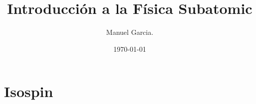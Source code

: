\documentclass{article}
\title{Introducción a la Física Subatomic }
\author{Manuel Garcia.}
\date{\today}
\begin{document}
\maketitle

\section{Isospin}
\end{document}
